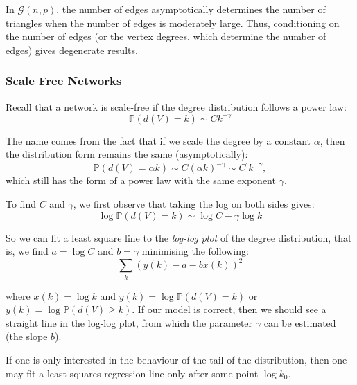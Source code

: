 \documentclass{article}
\begin{document}
\begin{remark}
    In $\mathcal{G}(n,p)$, the number of edges asymptotically determines
the number of triangles when the number of edges is moderately large. Thus,
conditioning on the number of edges (or the vertex degrees, which determine
the number of edges) gives degenerate results.
\end{remark}

\subsubsection{Scale Free Networks}
Recall that a network is scale-free if the degree distribution follows a power law:
\begin{equation*}
    \mathbb{P}(d(V)=k)\sim C k^{-\gamma}
\end{equation*}

\begin{remark}
    The name comes from the fact that if we scale the degree by a constant $\alpha$, then the distribution form remains the same (asymptotically):
    \[\mathbb{P}(d(V)=\alpha k)\sim C(\alpha k)^{-\gamma}\sim C^{\prime}k^{-\gamma},\]
    which still has the form of a power law with the same exponent $\gamma$.
\end{remark}

To find $C$ and $\gamma$, we first observe that taking the log on both sides gives:
\begin{equation*}
    \log \mathbb{P}(d(V)=k)\sim \log C - \gamma \log k
\end{equation*}

So we can fit a least square line to the \textit{log-log plot} of the degree distribution, that is, we find  $a=\log C$ and $b=\gamma$ minimising the following:
\begin{equation}\label{eq:least_squares_power_law}
    \sum_k (y(k)-a-b x(k))^{2}
\end{equation}

where $x(k)=\log k$ and $y(k)=\log \mathbb{P}(d(V)=k)$ or $y(k)=\log \mathbb{P}(d(V)\geq k)$. If our model is correct, then we should see a straight line in the log-log plot, from which the parameter $\gamma$ can be estimated (the slope $b$).

\begin{remark}
    If one is only interested in the behaviour of the tail of the distribution, then one may fit a least-squares regression line only after some point $\log k_0$.
\end{remark}
\end{document}
